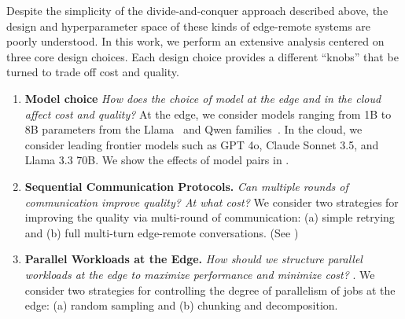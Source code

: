 Despite the simplicity of the divide-and-conquer approach described above, the design and hyperparameter space of these kinds of edge-remote systems are poorly understood.
In this work, we perform an extensive analysis centered on three core design choices. Each design choice provides a different ``knobs'' that be turned to trade off cost and quality. 
\begin{enumerate}
  \item \textbf{Model choice} \textit{How does the choice of model at the edge and in the cloud affect cost and quality?} At the edge, we consider models ranging from 1B to 8B parameters from the Llama~\citep{dubey2024llama3} and Qwen families~\citep{bai2024qwen2.5}. In the cloud, we consider leading frontier models such as GPT 4o, Claude Sonnet 3.5, and Llama 3.3 70B. We show the effects of model pairs in .
  \item \textbf{Sequential Communication Protocols.} \textit{Can multiple rounds of communication improve quality? At what cost?} We consider two strategies for improving the quality via multi-round of communication: (a) simple retrying and (b) full multi-turn edge-remote conversations. (See )
  \item \textbf{Parallel Workloads at the Edge.} \textit{How should we structure parallel workloads at the edge to maximize performance and minimize cost?} . We consider two strategies for controlling the degree of parallelism of jobs at the edge: (a) random sampling and (b) chunking and decomposition. 
\end{enumerate}

